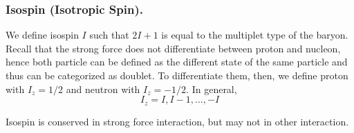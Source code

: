 \documentclass[../../../main.tex]{subfiles}
\begin{document}
\subsubsection*{Isospin (Isotropic Spin).} We define isospin $I$ such that $2I+1$ is equal to the multiplet type of the baryon. Recall that the strong force does not differentiate between proton and nucleon, hence both particle can be defined as the different state of the same particle and thus can be categorized as doublet. To differentiate them, then, we define proton with $I_z=1/2$ and neutron with $I_z=-1/2$. In general,
\begin{equation*}
    I_z=I,I-1,\dots,-I
\end{equation*}

Isospin is conserved in strong force interaction, but may not in other interaction.
\end{document}
